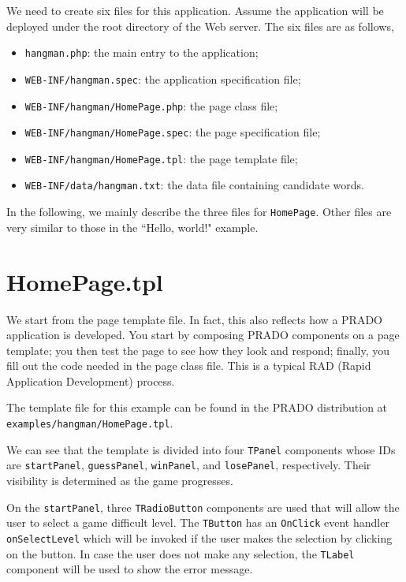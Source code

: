\documentclass{book}
\begin{document}
We need to create six files for this application. Assume the
application will be deployed under the root directory of the Web
server. The six files are as follows,
\begin{itemize}
\item \verb|hangman.php|: the main entry to the application;

\item \verb|WEB-INF/hangman.spec|: the application specification
file;

\item \verb|WEB-INF/hangman/HomePage.php|: the page class file;

\item \verb|WEB-INF/hangman/HomePage.spec|: the page specification
file;

\item \verb|WEB-INF/hangman/HomePage.tpl|: the page template file;

\item \verb|WEB-INF/data/hangman.txt|: the data file containing
candidate words.
\end{itemize}


In the following, we mainly describe the three files for
\verb|HomePage|. Other files are very similar to those in the
``Hello, world!" example.


\section{HomePage.tpl}

We start from the page template file. In fact, this also reflects
how a PRADO application is developed. You start by composing PRADO
components on a page template; you then test the page to see how
they look and respond; finally, you fill out the code needed in
the page class file. This is a typical RAD (Rapid Application
Development) process.


The template file for this example can be found in the PRADO
distribution at \verb|examples/hangman/HomePage.tpl|.


We can see that the template is divided into four \verb|TPanel|
components whose IDs are \verb|startPanel|, \verb|guessPanel|,
\verb|winPanel|, and \verb|losePanel|, respectively. Their
visibility is determined as the game progresses.


On the \verb|startPanel|, three \verb|TRadioButton| components are
used that will allow the user to select a game difficult level.
The \verb|TButton| has an \verb|OnClick| event handler
\verb|onSelectLevel| which will be invoked if the user makes the
selection by clicking on the button. In case the user does not
make any selection, the \verb|TLabel| component will be used to
show the error message.
\end{document}
